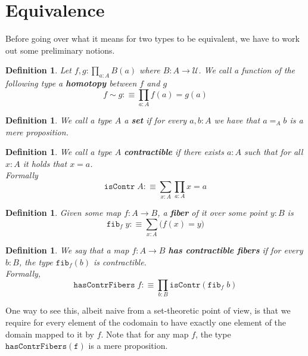 \documentclass[12pt]{report}
\newtheorem{defn}[thm]{Definition}
\theoremstyle{definition}
\begin{document}
\section{Equivalence}
	Before going over what it means for two types to be equivalent, we have to work out some preliminary notions. 
	\begin{defn}
	Let $f,g : \prod_{a:A}B(a)$ where $B :A \rightarrow \mathcal{U}$. 
	We call a function of the following type a \textbf{homotopy} between $f$ and $g$
	$$f\sim g :\equiv \prod_{a:A}f(a) = g(a)$$
	\end{defn}

	\begin{defn}
	We call a type $A$ a \textbf{set} if for every $a,b : A$ we have that $a =_A b$ is a mere proposition.
	\end{defn}

	\begin{defn}
	We call a type $A$ \textbf{contractible} if there exists $a : A$ such that for all $x : A$ it holds that $x = a$.\\
	Formally
	$$\mathtt{isContr}\; A :\equiv \sum_{x : A}\prod_{a :A}x=a$$
	\end{defn}

	\begin{defn}
	Given some map $f : A \rightarrow B$, a \textbf{fiber} of it over some point $y : B$ is
	$$\mathtt{fib}_f\; y :\equiv \sum_{x : A} \big(f(x) = y\big)$$
	\end{defn}

	\begin{defn}
	We say that a map $f : A\rightarrow B$ \textbf{has contractible fibers} if for every $b : B$, the type $\mathtt{fib}_f(b)$ is contractible.\\
	Formally, 
	$$ \mathtt{hasContrFibers}\; f : \equiv \prod_{b : B} \mathtt{isContr}(\mathtt{fib}_f\; b)$$
 	\end{defn}
 	One way to see this, albeit naive from a set-theoretic point of view, is that we require for every element of the codomain to have exactly one element of the domain mapped to it by $f$. 
 	Note that for any map $f$, the type $\mathtt{hasContrFibers(f)}$ is a mere proposition. 
\end{document}
